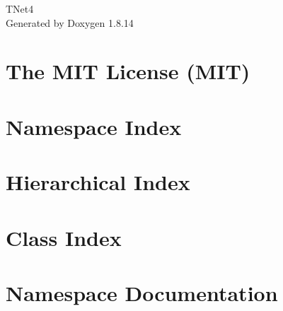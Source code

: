 \documentclass[twoside]{book}
\newcommand{\+}{\discretionary{\mbox{\scriptsize$\hookleftarrow$}}{}{}}
\newcommand{\clearemptydoublepage}{%
  \newpage{\pagestyle{empty}\cleardoublepage}%
}
\begin{document}
\hypersetup{pageanchor=false,
             bookmarksnumbered=true,
             pdfencoding=unicode
            }
\begin{titlepage}
\vspace*{7cm}
\begin{center}%
{\Large T\+Net4 }\\
\vspace*{1cm}
{\large Generated by Doxygen 1.8.14}\\
\end{center}
\end{titlepage}
\clearemptydoublepage
{}
\tableofcontents
\clearemptydoublepage
{}
\hypersetup{pageanchor=true}

\chapter{The M\+IT License (M\+IT)}
\label{md_wwwroot_lib_jquery-validation__l_i_c_e_n_s_e}

\chapter{Namespace Index}

\chapter{Hierarchical Index}

\chapter{Class Index}

\chapter{Namespace Documentation}




































\end{document}
